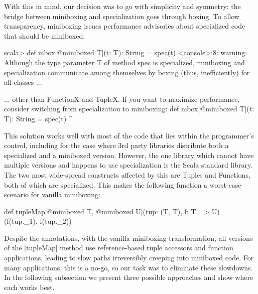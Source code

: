 With this in mind, our decision was to go with simplicity and symmetry: the bridge between miniboxing and specialization goes through boxing. To allow transparency, miniboxing issues performance advisories about specialized code that should be miniboxed:

\vspace{-0.05em}

\begin{lstlisting-nobreak-nolang}
scala>  def mbox[@miniboxed T](t: T): String = spec(t)
<console>:8: warning: Although the type parameter T of method spec is specialized, miniboxing and specialization communicate among themselves by boxing (thus, inefficiently) for all classes ...
\end{lstlisting-nobreak-nolang}

\begin{lstlisting-nobreak-nolang}
 ... other than FunctionX and TupleX. If you want to maximize performance, consider switching from specialization to miniboxing:
        def mbox[@miniboxed T](t: T): String = spec(t)
                                                            ^
\end{lstlisting-nobreak-nolang}

This solution works well with most of the code that lies within the programmer's control, including for the case where 3rd party libraries distribute both a specialized and a miniboxed version. However, the one library which cannot have multiple versions and happens to use specialization is the Scala standard library. The two most wide-spread constructs affected by this are Tuples and Functions, both of which are specialized. This makes the following function a worst-case scenario for vanilla miniboxing:

\begin{lstlisting-nobreak}
 def tupleMap[@miniboxed T,
                  @miniboxed U](tup: (T, T), f: T => U) =
   (f(tup._1), f(tup._2))
\end{lstlisting-nobreak}

Despite the annotations, with the vanilla miniboxing transformation, all versions of the |tupleMap| method use reference-based tuple accessors and function applications, leading to slow paths irreversibly creeping into miniboxed code. For many applications, this is a no-go, so our task was to eliminate these slowdowns. In the following subsection we present three possible approaches and show where each works best.

\vspace{-0.5em}

